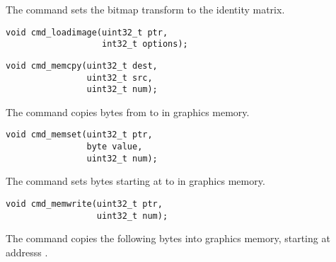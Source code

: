 The  command
sets the bitmap transform to the identity matrix.



\begin{framed}
\begin{verbatim}
void cmd_loadimage(uint32_t ptr,
                   int32_t options);
\end{verbatim}
\end{framed}



\begin{framed}
\begin{verbatim}
void cmd_memcpy(uint32_t dest,
                uint32_t src,
                uint32_t num);
\end{verbatim}
\end{framed}

The  command
copies  bytes from  to 
in graphics memory.



\begin{framed}
\begin{verbatim}
void cmd_memset(uint32_t ptr,
                byte value,
                uint32_t num);
\end{verbatim}
\end{framed}

The  command
sets  bytes starting at  to 
in graphics memory.



\begin{framed}
\begin{verbatim}
void cmd_memwrite(uint32_t ptr,
                  uint32_t num);
\end{verbatim}
\end{framed}

The  command
copies the following  bytes into
graphics memory, starting at addresss .


